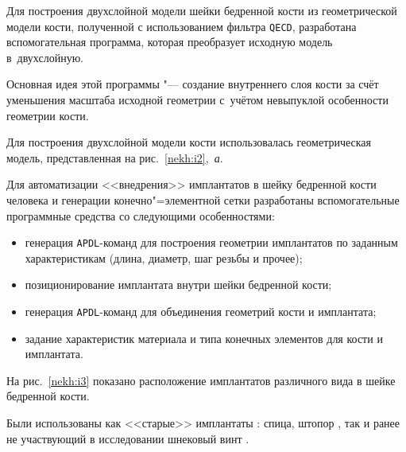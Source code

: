 Для построения двухслойной модели шейки бедренной кости  из геометрической модели кости, полученной с использованием фильтра {\tt QECD}, разработана вспомогательная программа, которая преобразует исходную модель в~двухслойную.  

Основная идея этой программы "--- создание внутреннего слоя кости за счёт уменьшения масштаба исходной геометрии с~учётом невыпуклой особенности геометрии кости.

Для  построения двухслойной модели кости использовалась геометрическая модель, представленная на рис.~\ref{nekh:i2},~{\sl а}.





Для автоматизации <<внедрения>> имплантатов в шейку бедренной кости человека и генерации конечно"=элементной сетки  разработаны вспомогательные программные средства со следующими особенностями:

\begin{itemize}

\item генерация {\tt APDL}-команд для построения геометрии имплантатов по заданным характеристикам (длина, диаметр, шаг резьбы и прочее);

\item позиционирование имплантата внутри шейки бедренной кости;

\item генерация {\tt APDL}-команд для объединения геометрий кости и имплантата;

\item задание характеристик материала и типа конечных элементов для кости и имплантата.

\end{itemize}





На рис.~\ref{nekh:i3} показано расположение имплантатов различного вида в шейке бедренной кости. 

Были использованы как <<старые>> имплантаты \cite{nekh:b2}: спица, штопор \cite{nekh:b9}, так и ранее не участвующий в исследовании \cite{nekh:b2} шнековый винт \cite{nekh:b9}. 






